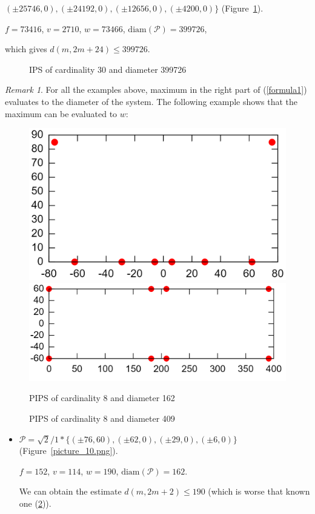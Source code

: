 \documentclass[12pt]{article}
\theoremstyle{theorem}
\theoremstyle{dfn}
\theoremstyle{remark}
\newtheorem{remark}{Remark}
\begin{document}
\begin{itemize}
$
(\pm 25746 , 0),
(\pm 24192 , 0),
(\pm 12656 , 0),
(\pm 4200 , 0)\}
$
(Figure~\ref{picture_26.png}).

$f = 73416$, $v = 2710$, $w = 73466$, $\operatorname{diam(\mathcal{P})} = 399726$,

which gives $d(m, 2m + 24) \leq 399726$.


\begin{figure}[h!]
\parbox{1\linewidth}{\caption{IPS of cardinality 30 and diameter 399726}
\label{picture_26.png}}
\end{figure}


\end{itemize}

\begin{remark}
For all the examples above, maximum in the right part of (\ref{formula1})
evaluates to the diameter of the system.
The following example shows that the maximum can be evaluated to $w$:
\end{remark}


\begin{figure}[h!]
	\includegraphics[width=.48\linewidth]{picture_10.png}
	\hfill
	\includegraphics[width=.48\linewidth]{picture.png}
	\\
	\parbox{.48\linewidth}{\caption{PIPS of cardinality 8 and diameter 162}
	\label{picture_10.png}}
	\hfill
	\parbox{.48\linewidth}{\caption{PIPS of cardinality 8 and diameter 409}
	\label{picture.png}}
\end{figure}


\begin{itemize}
\setlength{\itemsep}{-1mm}


\item
$\mathcal{P}=\sqrt{2}/{1} * \{ (\pm 76, 60),
(\pm 62 , 0),
(\pm 29 , 0),
(\pm 6 , 0)\}
$
(Figure~\ref{picture_10.png}).

$f = 152$, $v = 114$, $w = 190$, $\operatorname{diam(\mathcal{P})} = 162$.

We can obtain the estimate $d(m, 2m + 2) \leq 190$ (which
is worse that known one (\hyperlink{d2}{2})).

\end{itemize}
\end{document}
